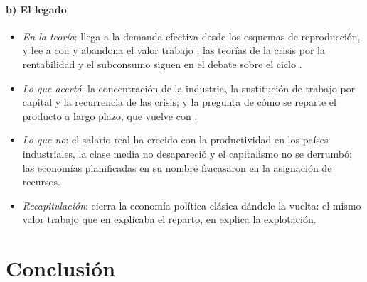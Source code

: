 \documentclass[11pt]{article}
\begin{document}
\paragraph{b) El legado}
\begin{itemize}
\item \emph{En la teoría}:  llega a la demanda efectiva desde los esquemas de reproducción, y \textcite{Robinson1942Essay} lee a  con  y abandona el valor trabajo ; las teorías de la crisis por la rentabilidad y el subconsumo siguen en el debate sobre el ciclo .
\item \emph{Lo que acertó}: la concentración de la industria, la sustitución de trabajo por capital y la recurrencia de las crisis; y la pregunta de cómo se reparte el producto a largo plazo, que vuelve con \textcite{Piketty2014} .
\item \emph{Lo que no}: el salario real ha crecido con la productividad en los países industriales, la clase media no desapareció y el capitalismo no se derrumbó; las economías planificadas en su nombre fracasaron en la asignación de recursos.
\item \emph{Recapitulación}:  cierra la economía política clásica dándole la vuelta: el mismo valor trabajo que en  explicaba el reparto, en  explica la explotación.
\end{itemize}

\section*{Conclusión}
\end{document}
